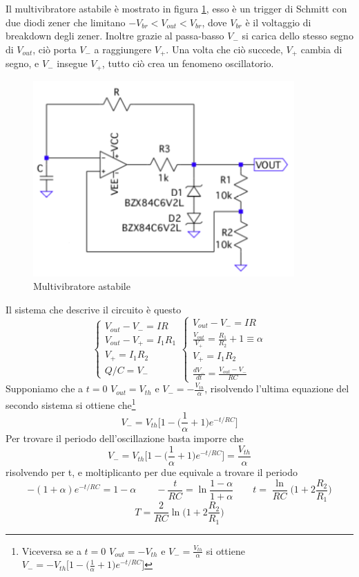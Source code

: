 \documentclass{article}
\begin{document}
		Il multivibratore astabile è mostrato in figura \ref{fig:multivibratore}, esso è un trigger di Schmitt con due diodi zener che limitano $-V_{br}<V_{out}<V_{br}$, dove $V_{br}$ è il voltaggio di breakdown degli zener. Inoltre grazie al passa-basso $V_-$ si carica dello stesso segno di $V_{out}$, ciò porta $V_-$ a raggiungere $V_+$.\newline
		Una volta che ciò succede, $V_+$ cambia di segno, e $V_-$ insegue $V_+$, tutto ciò crea un fenomeno oscillatorio.\newline
		\begin{figure}
			\label{fig:multivibratore}
			\centering
			\includegraphics[width=100mm]{immagini/multivibratore.png}
			\caption{Multivibratore astabile}
		\end{figure}
		Il sistema che descrive il circuito è questo
		\begin{equation}
			\begin{cases}
				V_{out}-V_-=IR\\
				V_{out}-V_+=I_1R_1\\
				V_+=I_1R_2\\
				Q/C=V_-
			\end{cases}
			\begin{cases}
				V_{out}-V_-=IR\\
				\frac{V_{out}}{V_+}=\frac{R_1}{R_2}+1\equiv \alpha\\
				V_+=I_1R_2\\
				\frac{dV_-}{dt}=\frac{V_{out}-V_-}{RC}
			\end{cases}
		\end{equation}
		Supponiamo che a $t=0$ $V_{out}=V_{th}$ e $V_-=-\frac{V_{th}}{\alpha}$, risolvendo l'ultima equazione del secondo sistema si ottiene che\footnote{Viceversa se a $t=0$ $V_{out}=-V_{th}$ e $V_-=\frac{V_{th}}{\alpha}$ si ottiene $V_-=-V_{th}\bigg[1-\bigg(\frac{1}{\alpha}+1\bigg)e^{-t/RC}\bigg]$}
		\[
			V_-=V_{th}\bigg[1-\bigg(\frac{1}{\alpha}+1\bigg)e^{-t/RC}\bigg]
		\]		
		Per trovare il periodo dell'oscillazione basta imporre che 
		\[
			V_-=V_{th}\bigg[1-\bigg(\frac{1}{\alpha}+1\bigg)e^{-t/RC}\bigg]=\frac{V_{th}}{\alpha}
		\]
		risolvendo per t, e moltiplicanto per due equivale a trovare il periodo
		\[
			-(1+\alpha)e^{-t/RC}=1-\alpha\qquad -\frac{t}{RC}=\ln\frac{1-\alpha}{1+\alpha}\qquad t=\frac{\ln}{RC}\bigg(1+2\frac{R_2}{R_1} \bigg)
		\]
		\begin{equation}
			T=\frac{2}{RC}\ln\bigg(1+2\frac{R_2}{R_1} \bigg)
		\end{equation}
\end{document}
